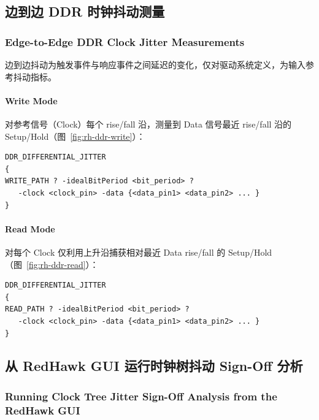 


\subsection{边到边 DDR 时钟抖动测量}
\subsubsection*{Edge-to-Edge DDR Clock Jitter Measurements}

边到边抖动为触发事件与响应事件之间延迟的变化，仅对驱动系统定义，为输入参考抖动指标。

\paragraph{Write Mode}
对参考信号（Clock）每个 rise/fall 沿，测量到 Data 信号最近 rise/fall 沿的 Setup/Hold（图~\ref{fig:rh-ddr-write}）：
\begin{lstlisting}
DDR_DIFFERENTIAL_JITTER
{
WRITE_PATH ? -idealBitPeriod <bit_period> ?
   -clock <clock_pin> -data {<data_pin1> <data_pin2> ... }
}
\end{lstlisting}


\paragraph{Read Mode}
对每个 Clock 仅利用上升沿捕获相对最近 Data rise/fall 的 Setup/Hold（图~\ref{fig:rh-ddr-read}）：
\begin{lstlisting}
DDR_DIFFERENTIAL_JITTER
{
READ_PATH ? -idealBitPeriod <bit_period> ?
   -clock <clock_pin> -data {<data_pin1> <data_pin2> ... }
}
\end{lstlisting}


\subsection{从 RedHawk GUI 运行时钟树抖动 Sign-Off 分析}
\subsubsection*{Running Clock Tree Jitter Sign-Off Analysis from the RedHawk GUI}

